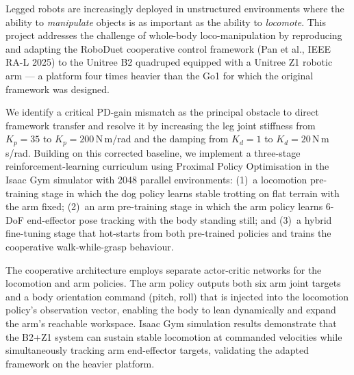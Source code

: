 
Legged robots are increasingly deployed in unstructured environments where
the ability to \emph{manipulate} objects is as important as the ability to
\emph{locomote}.
This project addresses the challenge of whole-body loco-manipulation by
reproducing and adapting the RoboDuet cooperative control framework
(Pan et al., IEEE RA-L 2025) to the Unitree B2 quadruped equipped with a
Unitree Z1 robotic arm --- a platform four times heavier than the Go1
for which the original framework was designed.

We identify a critical PD-gain mismatch as the principal obstacle to
direct framework transfer and resolve it by increasing the leg joint
stiffness from $K_p = 35$ to $K_p = 200$\,N\,m/rad and the damping
from $K_d = 1$ to $K_d = 20$\,N\,m\,s/rad.
Building on this corrected baseline, we implement a three-stage
reinforcement-learning curriculum using Proximal Policy Optimisation
in the Isaac Gym simulator with 2048 parallel environments:
(1)~a locomotion pre-training stage in which the dog policy learns
stable trotting on flat terrain with the arm fixed;
(2)~an arm pre-training stage in which the arm policy learns 6-DoF
end-effector pose tracking with the body standing still; and
(3)~a hybrid fine-tuning stage that hot-starts from both pre-trained
policies and trains the cooperative walk-while-grasp behaviour.

The cooperative architecture employs separate actor-critic networks for
the locomotion and arm policies.
The arm policy outputs both six arm joint targets and a body
orientation command (pitch, roll) that is injected into the locomotion
policy's observation vector, enabling the body to lean dynamically and
expand the arm's reachable workspace.
Isaac Gym simulation results demonstrate that the B2+Z1 system can
sustain stable locomotion at commanded velocities while simultaneously
tracking arm end-effector targets, validating the adapted framework
on the heavier platform.
